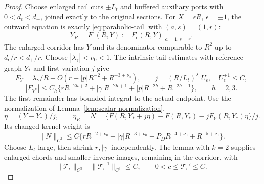 \begin{proof}
Choose enlarged tail cuts \(\pm L_t\) and buffered auxiliary ports
with \(0<d_\epsilon<d_+\), joined exactly to the original sections.
For \(X=\epsilon R\), \(\epsilon=\pm1\), the outward equation is
exactly \eqref{eq:parabolic-tail} with \((a,s)=(1,r)\):
\begin{equation}\label{deg:det-tail-graph}
 Y_R=F^\epsilon(R,Y):=F_\epsilon(R,Y)|_{a=1,s=r}.
\end{equation}
The enlarged corridor has \(Y\) and its denominator comparable to
\(R^2\) up to \(d_\epsilon/r<d_+/r\). Choose
\(|\lambda_\gamma|<\nu_0<1\). The intrinsic tail estimates with
reference graph \(Y_*\) and first variation \(j\) give
\begin{equation}\label{deg:det-tail-action}
 F_Y=\lambda_\gamma/R+O(r+|p|R^{-2}+R^{-3+\nu_0}),\qquad
 j=(R/L_t)^{\lambda_\gamma}U_\epsilon,\quad U_\epsilon^{\pm1}\le C,
\end{equation}
\begin{equation}\label{deg:det-rational-derivatives}
 |F_{Y^h}|\le C_h\{rR^{-2h+2}+|\gamma|R^{-2h+1}
              +|p|R^{-2h}+R^{-2h-1}\},\qquad h=2,3.
\end{equation}
The first remainder has bounded integral to the actual endpoint.
Use the normalization of Lemma~\ref{lem:scalar-normalization},
\begin{equation}\label{deg:det-normalized-tail}
 \eta=(Y-Y_*)/j,\qquad
 \eta_R=N=\{F(R,Y_*+j\eta)-F(R,Y_*)-jF_Y(R,Y_*)\eta\}/j.
\end{equation}
Its changed kernel weight is
\begin{equation}\label{deg:det-normalized-kernel}
 \|N\|_{C^3}\le C\{rR^{-2+\nu_0}+|\gamma|R^{-3+\nu_0}
                      +P_DR^{-4+\nu_0}+R^{-5+\nu_0}\}.
\end{equation}
Choose \(L_t\) large, then shrink \(r,|\gamma|\) independently.
The lemma with \(k=2\) supplies enlarged chords and smaller inverse
images, remaining in the corridor, with
\begin{equation}\label{deg:det-phase-variations}
 \|\mathcal T_\epsilon\|_{C^3}
 +\|\mathcal T_\epsilon^{-1}\|_{C^3}\le C,\qquad
 0<c\le\mathcal T_\epsilon'\le C.
\end{equation}


\end{proof}
